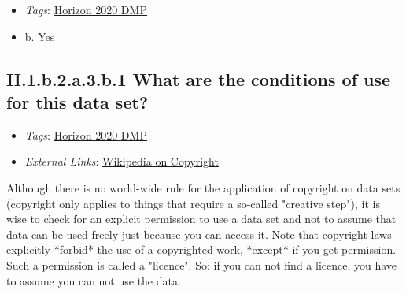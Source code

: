 \documentclass[a4paper,12pt]{report}
\begin{document}
\label{82fd0cce-2b41-423f-92ad-636d0872045c.efc80cc8-8318-4f8c-acb7-dc1c60e491c1.2663b978-5125-4224-9930-0a50dbe895c9.be872000-cb98-442f-999c-ca3ef58dcfe8.c8bd43ef-4b52-48d9-be2a-7f51dad8d3c4.f5e129dc-d59d-4352-a5ed-25efe1d83811}


\begin{itemize}
  \item \textit{Tags}: \ul{Horizon 2020 DMP}
  \end{itemize}




\begin{itemize}
  \item[\CheckmarkBold] b. Yes
\end{itemize}




\subsection*{\protect\textcolor{colorSecId}{II.1.b.2.a.3.b.1} What are the conditions of use for this data set?}

\label{82fd0cce-2b41-423f-92ad-636d0872045c.efc80cc8-8318-4f8c-acb7-dc1c60e491c1.2663b978-5125-4224-9930-0a50dbe895c9.be872000-cb98-442f-999c-ca3ef58dcfe8.c8bd43ef-4b52-48d9-be2a-7f51dad8d3c4.f5e129dc-d59d-4352-a5ed-25efe1d83811.7fc8d3c9-a2d5-4d47-9df4-56af48ca85e1.69999c2c-2710-480e-b8ac-8a8fc6f582e5}


\begin{itemize}
  \item \textit{Tags}: \ul{Horizon 2020 DMP}
  
  \item \textit{External Links}: \href{https://en.wikipedia.org/wiki/Copyright}{Wikipedia on Copyright}\end{itemize}


\noindent
\begin{markdown}
Although there is no world-wide rule for the application of copyright on data sets (copyright only applies to things that require a so-called "creative step"), it is wise to check for an explicit permission to use a data set and not to assume that data can be used freely just because you can access it. 
Note that copyright laws explicitly *forbid* the use of a copyrighted work, *except* if you get permission. Such a permission is called a "licence". So: if you can not find a licence, you have to assume you can not use the data.
\end{markdown}
\end{document}
